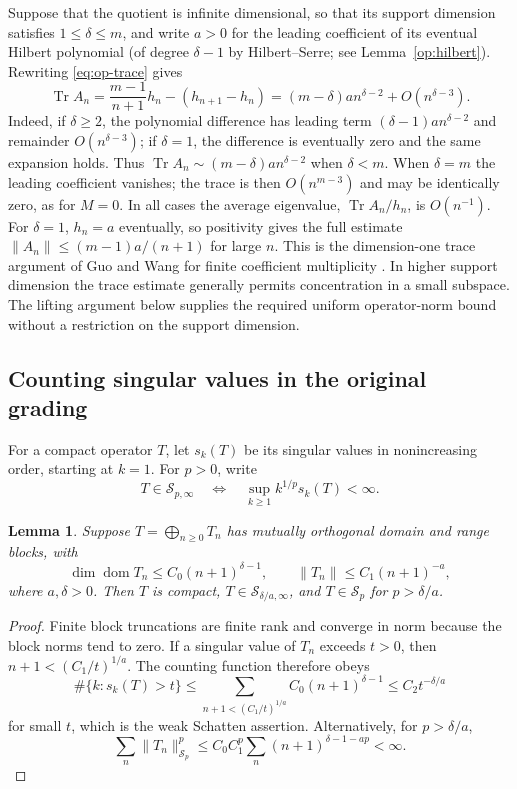 \documentclass[11pt,reqno]{amsart}
\numberwithin{equation}{section}
\newtheorem{lemma}[theorem]{Lemma}
\theoremstyle{definition}
\theoremstyle{remark}
\newcommand{\cS}{\mathcal S}
\DeclareMathOperator{\Tr}{Tr}
\begin{document}
Suppose that the quotient is infinite dimensional, so that its support
dimension satisfies $1\leq\delta\leq m$, and write $a>0$ for the leading
coefficient of its eventual Hilbert polynomial (of degree $\delta-1$
by Hilbert--Serre; see Lemma~\ref{op:hilbert}). Rewriting
\eqref{eq:op-trace} gives
\begin{equation}\label{eq:op-trace-asymptotic}
 \Tr A_n=\frac{m-1}{n+1}h_n-(h_{n+1}-h_n)
       =(m-\delta)a n^{\delta-2}+O(n^{\delta-3}).
\end{equation}
Indeed, if $\delta\geq2$, the polynomial difference has leading term
$(\delta-1)a n^{\delta-2}$ and remainder $O(n^{\delta-3})$; if
$\delta=1$, the difference is eventually zero and the same expansion
holds. Thus $\Tr A_n\sim(m-\delta)a n^{\delta-2}$ when $\delta<m$.
When $\delta=m$ the leading coefficient vanishes; the trace is then
$O(n^{m-3})$ and may be identically zero, as for $M=0$. In all cases the
average eigenvalue, $\Tr A_n/h_n$, is $O(n^{-1})$. For $\delta=1$, $h_n=a$
eventually, so positivity gives the full estimate
$\|A_n\|\leq (m-1)a/(n+1)$ for large $n$. This is the dimension-one
trace argument of Guo and Wang for finite coefficient multiplicity
\cite[Proposition~4.1, p.~920]{GuoWang}. In higher support dimension the
trace estimate generally permits concentration in a small subspace.
The lifting argument below supplies the required uniform operator-norm
bound without a restriction on the support dimension.

\subsection{Counting singular values in the original grading}
For a compact operator $T$, let $s_k(T)$ be its singular values in
nonincreasing order, starting at $k=1$.  For $p>0$, write
\[
 T\in\cS_{p,\infty}\quad\Longleftrightarrow\quad
 \sup_{k\ge1} k^{1/p}s_k(T)<\infty.
\]

\begin{lemma}\label{op:counting}
Suppose $T=\bigoplus_{n\ge0}T_n$ has mutually orthogonal domain and
range blocks, with
\[
 \dim\operatorname{dom}T_n\le C_0(n+1)^{\delta-1},\qquad
 \|T_n\|\le C_1(n+1)^{-a},
\]
where $a,\delta>0$.  Then $T$ is compact,
$T\in\cS_{\delta/a,\infty}$, and $T\in\cS_p$ for $p>\delta/a$.
\end{lemma}
\begin{proof}
Finite block truncations are finite rank and converge in norm because
the block norms tend to zero.  If a singular value of $T_n$ exceeds
$t>0$, then $n+1<(C_1/t)^{1/a}$.  The counting function therefore obeys
\[
 \#\{k:s_k(T)>t\}
 \le\sum_{n+1<(C_1/t)^{1/a}}C_0(n+1)^{\delta-1}
 \le C_2t^{-\delta/a}
\]
for small $t$, which is the weak Schatten assertion.  Alternatively,
for $p>\delta/a$,
\[
 \sum_n\|T_n\|_{\cS_p}^p
 \le C_0C_1^p\sum_n(n+1)^{\delta-1-ap}<\infty.
\]
\end{proof}
\end{document}
